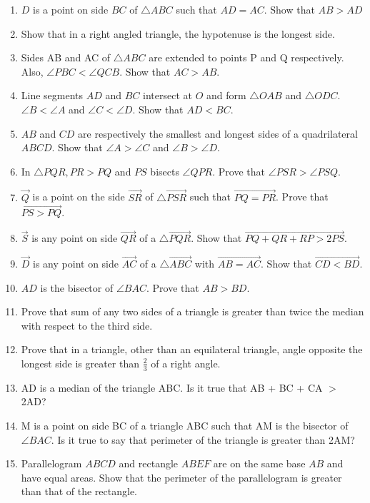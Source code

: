 \begin{enumerate}[label=\thesection.\arabic*.,ref=\thesection.\theenumi]
\item $D$ is a point on side $BC$ of $\triangle  ABC$ such that $AD = AC$. Show that $AB > AD$
\item Show that in a right angled triangle, the hypotenuse is the longest side.
\item Sides AB and AC of $\triangle  ABC$ are extended to points P and Q respectively. Also, $\angle  PBC < \angle  QCB$. Show that $AC > AB$.

\item Line segments $AD$ and $BC$ intersect at $O$ and form $\triangle OAB$ and $\triangle ODC$. $\angle  B < \angle  A$ and $\angle  C < \angle  D$. Show that $AD < BC$.

\item $AB$ and $CD$ are respectively the smallest and longest sides of a quadrilateral $ABCD$. Show that $\angle  A > \angle  C$ and $\angle  B > \angle  D$.
%
\item In $\triangle PQR,  PR > PQ$ and $PS$ bisects $\angle  QPR$. Prove that $\angle  PSR > \angle  PSQ$.
\item $\vec{Q}$ is a point on the side $\vec{SR}$ of $\triangle \vec{PSR}$ such that $\vec{PQ=PR}$. Prove that $\vec{PS>PQ}$.
\item $\vec{S}$ is any point on side $\vec{QR}$ of a $\triangle \vec{PQR}$. Show that $\vec{PQ+QR+RP>2PS}$.
\item $\vec{D}$ is any point on side $\vec{AC}$ of a $\triangle \vec{ABC}$ with $\vec{AB=AC}$. Show that $\vec{CD<BD}$.
\item $AD$ is the bisector of $\angle BAC$. Prove that $AB>BD$.
\item Prove that sum of any two sides of a triangle is greater than twice the median with respect to the third side.
\item Prove that in a triangle, other than an equilateral triangle, angle opposite the longest side is greater than $\frac{2}{3}$ of a right angle.
\item AD is a median of the triangle ABC. Is it true that AB + BC + CA $ > $ 2AD? 
\item M is a point on side BC of a triangle ABC such that AM is the bisector of $ \angle{BAC} $. Is it true to say that perimeter of the triangle is greater than 2AM?
\item Parallelogram $ABCD$ and rectangle $ABEF$ are on the same base $AB$ and have equal areas. Show that the perimeter of the parallelogram is greater than that of the rectangle.
\end{enumerate}
